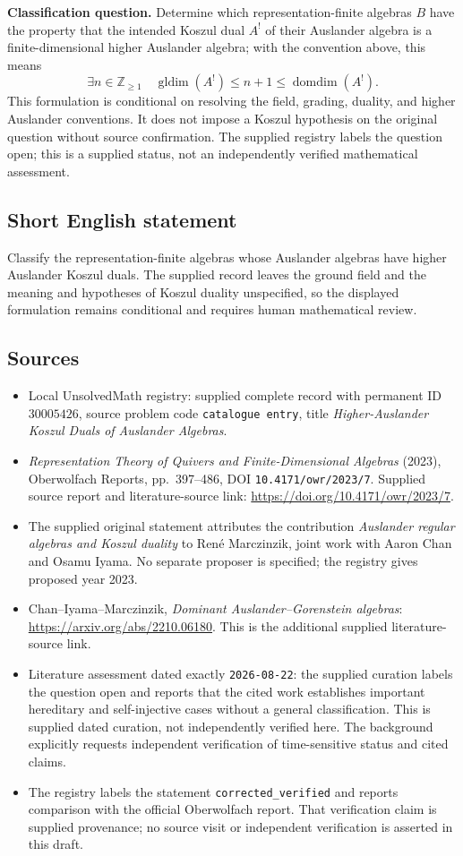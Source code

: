 \documentclass[11pt]{article}
\begin{document}
\textbf{Classification question.} Determine which representation-finite algebras \(B\) have the property that the intended Koszul dual \(A^{!}\) of their Auslander algebra is a finite-dimensional higher Auslander algebra; with the convention above, this means
\[
\exists n\in\mathbb Z_{\geq1}\quad
\operatorname{gldim}(A^{!})\leq n+1\leq\operatorname{domdim}(A^{!}).
\]
This formulation is conditional on resolving the field, grading, duality, and higher Auslander conventions. It does not impose a Koszul hypothesis on the original question without source confirmation. The supplied registry labels the question open; this is a supplied status, not an independently verified mathematical assessment.
\subsection{Short English statement}
Classify the representation-finite algebras whose Auslander algebras have higher Auslander Koszul duals. The supplied record leaves the ground field and the meaning and hypotheses of Koszul duality unspecified, so the displayed formulation remains conditional and requires human mathematical review.
\subsection{Sources}
\begin{itemize}
\item Local UnsolvedMath registry: supplied complete record with permanent ID \(30005426\), source problem code \texttt{catalogue entry}, title \emph{Higher-Auslander Koszul Duals of Auslander Algebras}.
\item \emph{Representation Theory of Quivers and Finite-Dimensional Algebras} (2023), Oberwolfach Reports, pp.~397--486, DOI \texttt{10.4171/owr/2023/7}. Supplied source report and literature-source link: \url{https://doi.org/10.4171/owr/2023/7}.
\item The supplied original statement attributes the contribution \emph{Auslander regular algebras and Koszul duality} to Ren\'e Marczinzik, joint work with Aaron Chan and Osamu Iyama. No separate proposer is specified; the registry gives proposed year 2023.
\item Chan--Iyama--Marczinzik, \emph{Dominant Auslander--Gorenstein algebras}: \url{https://arxiv.org/abs/2210.06180}. This is the additional supplied literature-source link.
\item Literature assessment dated exactly \texttt{2026-08-22}: the supplied curation labels the question open and reports that the cited work establishes important hereditary and self-injective cases without a general classification. This is supplied dated curation, not independently verified here. The background explicitly requests independent verification of time-sensitive status and cited claims.
\item The registry labels the statement \texttt{corrected\_verified} and reports comparison with the official Oberwolfach report. That verification claim is supplied provenance; no source visit or independent verification is asserted in this draft.
\end{itemize}
\end{document}
